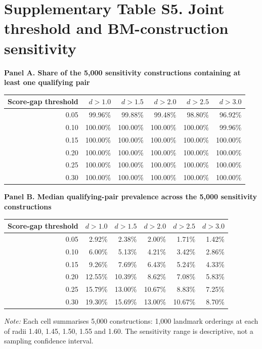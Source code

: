 \documentclass[10pt,a4paper]{article}
\begin{document}
\section*{Supplementary Table S5. Joint threshold and BM-construction sensitivity}
\textbf{Panel A. Share of the 5,000 sensitivity constructions containing at least one qualifying pair}
\begin{center}\small
\begin{tabular}{rrrrrr}
\toprule
Score-gap threshold & $d>1.0$ & $d>1.5$ & $d>2.0$ & $d>2.5$ & $d>3.0$\\
\midrule
0.05 & 99.96\% & 99.88\% & 99.48\% & 98.80\% & 96.92\%\\
0.10 & 100.00\% & 100.00\% & 100.00\% & 100.00\% & 99.96\%\\
0.15 & 100.00\% & 100.00\% & 100.00\% & 100.00\% & 100.00\%\\
0.20 & 100.00\% & 100.00\% & 100.00\% & 100.00\% & 100.00\%\\
0.25 & 100.00\% & 100.00\% & 100.00\% & 100.00\% & 100.00\%\\
0.30 & 100.00\% & 100.00\% & 100.00\% & 100.00\% & 100.00\%\\
\bottomrule
\end{tabular}
\end{center}
\textbf{Panel B. Median qualifying-pair prevalence across the 5,000 sensitivity constructions}
\begin{center}\small
\begin{tabular}{rrrrrr}
\toprule
Score-gap threshold & $d>1.0$ & $d>1.5$ & $d>2.0$ & $d>2.5$ & $d>3.0$\\
\midrule
0.05 & 2.92\% & 2.38\% & 2.00\% & 1.71\% & 1.42\%\\
0.10 & 6.00\% & 5.13\% & 4.21\% & 3.42\% & 2.86\%\\
0.15 & 9.26\% & 7.69\% & 6.43\% & 5.24\% & 4.33\%\\
0.20 & 12.55\% & 10.39\% & 8.62\% & 7.08\% & 5.83\%\\
0.25 & 15.79\% & 13.00\% & 10.67\% & 8.83\% & 7.25\%\\
0.30 & 19.30\% & 15.69\% & 13.00\% & 10.67\% & 8.70\%\\
\bottomrule
\end{tabular}
\end{center}
\textit{Note:} Each cell summarises 5,000 constructions: 1,000 landmark orderings at each of radii 1.40, 1.45, 1.50, 1.55 and 1.60. The sensitivity range is descriptive, not a sampling confidence interval.
\end{document}
